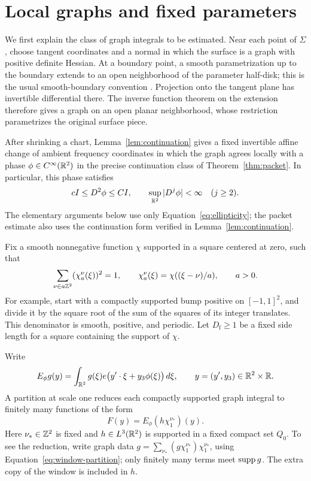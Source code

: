 \section{Local graphs and fixed parameters}\label{sec:setup}

We first explain the class of graph integrals to be estimated.
Near each point of \(\Sigma\), choose tangent coordinates and a
normal in which the surface is a graph with positive definite
Hessian. At a boundary point, a smooth parametrization up to the
boundary extends to an open neighborhood of the parameter
half-disk; this is the usual smooth-boundary convention
\cite[Chapter~1, pp.~27--28]{Lee2013Smooth}. Projection onto the tangent plane has invertible
differential there. The inverse function theorem on the extension
therefore gives a graph on an open planar neighborhood, whose
restriction parametrizes the original surface piece.

After shrinking a chart, Lemma~\ref{lem:continuation} gives a fixed
invertible affine change of ambient frequency coordinates in which
the graph agrees locally with a phase \(\phi\in C^\infty(\mathbb R^2)\)
in the precise continuation class of Theorem~\ref{thm:packet}.
In particular, this phase satisfies
\begin{equation}\label{eq:ellipticity}
 cI\le D^2\phi\le CI,\qquad
 \sup_{\mathbb R^2}|D^j\phi|<\infty\quad(j\ge2).
\end{equation}
The elementary arguments below use only
Equation~\eqref{eq:ellipticity}; the packet estimate also uses the
continuation form verified in Lemma~\ref{lem:continuation}.

Fix a smooth nonnegative function \(\chi\) supported in a square
centered at zero, such that
\begin{equation}\label{eq:window-partition}
 \sum_{\nu\in a\mathbb Z^2}(\chi_a^\nu(\xi))^2=1,\qquad
 \chi_a^\nu(\xi)=\chi((\xi-\nu)/a),\qquad a>0.
\end{equation}
For example, start with a compactly supported bump positive on
\([-1,1]^2\), and divide it by the square root of the sum of the
squares of its integer translates. This denominator is smooth,
positive, and periodic. Let \(D_{\mathrm f}\ge1\) be a fixed side
length for a square containing the support of \(\chi\).

Write
\[
 E_\phi g(y)=\int_{\mathbb R^2}g(\xi)
       e\bigl(y'\cdot\xi+y_3\phi(\xi)\bigr)\,d\xi,
 \qquad y=(y',y_3)\in\mathbb R^2\times\mathbb R.
\]
A partition at scale one reduces each compactly supported graph
integral to finitely many functions of the form
\begin{equation}\label{eq:local-F}
 F(y)=E_\phi(h\chi_1^{\nu_*})(y).
\end{equation}
Here \(\nu_*\in\mathbb Z^2\) is fixed and \(h\in L^3(\mathbb R^2)\) is supported
in a fixed compact set \(Q_0\). To see the reduction, write graph
data \(g=\sum_{\nu_*}(g\chi_1^{\nu_*})\chi_1^{\nu_*}\), using
Equation~\eqref{eq:window-partition}; only finitely many terms meet
\(\operatorname{supp} g\). The extra copy of the window is included in \(h\).

